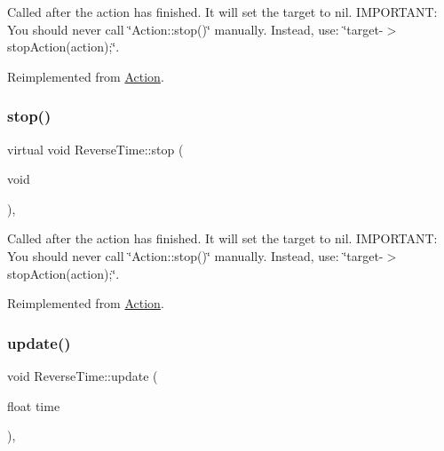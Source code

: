 Called after the action has finished. It will set the \textquotesingle{}target\textquotesingle{} to nil. I\+M\+P\+O\+R\+T\+A\+NT\+: You should never call \char`\"{}\+Action\+::stop()\char`\"{} manually. Instead, use\+: \char`\"{}target-\/$>$stop\+Action(action);\char`\"{}. 

Reimplemented from \hyperlink{classAction_a968267fa7a1dcc46a2976249a712d3c8}{Action}.

\mbox{\label{classReverseTime_ab4fbd1a9abd412981366ae8a7782180e}} 
\subsubsection{\texorpdfstring{stop()}{stop()}\hspace{0.1cm}{\footnotesize\ttfamily [2/2]}}
{\footnotesize\ttfamily virtual void Reverse\+Time\+::stop (\begin{DoxyParamCaption}\item[{void}]{ }\end{DoxyParamCaption})\hspace{0.3cm}{\ttfamily [override]}, {\ttfamily [virtual]}}

Called after the action has finished. It will set the \textquotesingle{}target\textquotesingle{} to nil. I\+M\+P\+O\+R\+T\+A\+NT\+: You should never call \char`\"{}\+Action\+::stop()\char`\"{} manually. Instead, use\+: \char`\"{}target-\/$>$stop\+Action(action);\char`\"{}. 

Reimplemented from \hyperlink{classAction_a968267fa7a1dcc46a2976249a712d3c8}{Action}.

\mbox{\label{classReverseTime_a7a321c5c5d148b4e9d718ba67c974297}} 
\subsubsection{\texorpdfstring{update()}{update()}\hspace{0.1cm}{\footnotesize\ttfamily [1/2]}}
{\footnotesize\ttfamily void Reverse\+Time\+::update (\begin{DoxyParamCaption}\item[{float}]{time }\end{DoxyParamCaption})\hspace{0.3cm}{\ttfamily [override]}, {\ttfamily [virtual]}}



